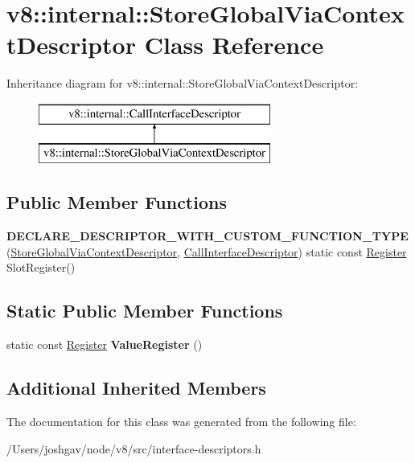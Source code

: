 \hypertarget{classv8_1_1internal_1_1_store_global_via_context_descriptor}{}\section{v8\+:\+:internal\+:\+:Store\+Global\+Via\+Context\+Descriptor Class Reference}
\label{classv8_1_1internal_1_1_store_global_via_context_descriptor}
Inheritance diagram for v8\+:\+:internal\+:\+:Store\+Global\+Via\+Context\+Descriptor\+:\begin{figure}[H]
\begin{center}
\leavevmode
\includegraphics[height=2.000000cm]{classv8_1_1internal_1_1_store_global_via_context_descriptor}
\end{center}
\end{figure}
\subsection*{Public Member Functions}
\begin{DoxyCompactItemize}
\item 
{\bfseries D\+E\+C\+L\+A\+R\+E\+\_\+\+D\+E\+S\+C\+R\+I\+P\+T\+O\+R\+\_\+\+W\+I\+T\+H\+\_\+\+C\+U\+S\+T\+O\+M\+\_\+\+F\+U\+N\+C\+T\+I\+O\+N\+\_\+\+T\+Y\+PE} (\hyperlink{classv8_1_1internal_1_1_store_global_via_context_descriptor}{Store\+Global\+Via\+Context\+Descriptor}, \hyperlink{classv8_1_1internal_1_1_call_interface_descriptor}{Call\+Interface\+Descriptor}) static const \hyperlink{structv8_1_1internal_1_1_register}{Register} Slot\+Register()\hypertarget{classv8_1_1internal_1_1_store_global_via_context_descriptor_aa9c547b3d8af401d3b555f1776566f98}{}\label{classv8_1_1internal_1_1_store_global_via_context_descriptor_aa9c547b3d8af401d3b555f1776566f98}

\end{DoxyCompactItemize}
\subsection*{Static Public Member Functions}
\begin{DoxyCompactItemize}
\item 
static const \hyperlink{structv8_1_1internal_1_1_register}{Register} {\bfseries Value\+Register} ()\hypertarget{classv8_1_1internal_1_1_store_global_via_context_descriptor_aa5152945275cb33390a97fe2035db54b}{}\label{classv8_1_1internal_1_1_store_global_via_context_descriptor_aa5152945275cb33390a97fe2035db54b}

\end{DoxyCompactItemize}
\subsection*{Additional Inherited Members}


The documentation for this class was generated from the following file\+:\begin{DoxyCompactItemize}
\item 
/\+Users/joshgav/node/v8/src/interface-\/descriptors.\+h\end{DoxyCompactItemize}
